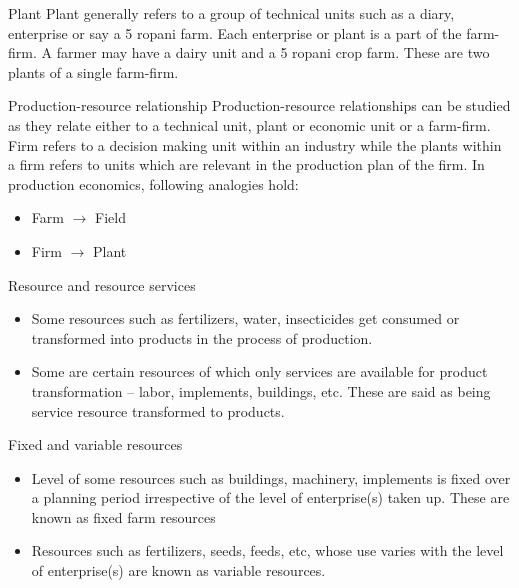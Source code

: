 \documentclass[12pt,ignorenonframetext,aspectratio=169]{beamer}
\providecommand{\tightlist}{%
  \setlength{\itemsep}{0pt}\setlength{\parskip}{0pt}}
\begin{document}
\begin{frame}{}
\protect\hypertarget{section-3}{}
\begin{block}{Plant}
\protect\hypertarget{plant}{}
Plant generally refers to a group of technical units such as a diary,
enterprise or say a 5 ropani farm. Each enterprise or plant is a part of
the farm-firm. A farmer may have a dairy unit and a 5 ropani crop farm.
These are two plants of a single farm-firm.
\end{block}

\begin{block}{Production-resource relationship}
\protect\hypertarget{production-resource-relationship}{}
Production-resource relationships can be studied as they relate either
to a technical unit, plant or economic unit or a farm-firm. Firm refers
to a decision making unit within an industry while the plants within a
firm refers to units which are relevant in the production plan of the
firm. In production economics, following analogies hold:

\begin{itemize}
  \item Farm $\longrightarrow$ Field
  \item Firm $\longrightarrow$ Plant
  \end{itemize}
\end{block}
\end{frame}

\begin{frame}{}
\protect\hypertarget{section-4}{}
\begin{block}{Resource and resource services}
\protect\hypertarget{resource-and-resource-services}{}
\begin{itemize}
\tightlist
\item
  Some resources such as fertilizers, water, insecticides get consumed
  or transformed into products in the process of production.
\item
  Some are certain resources of which only services are available for
  product transformation -- labor, implements, buildings, etc. These are
  said as being service resource transformed to products.
\end{itemize}
\end{block}

\begin{block}{Fixed and variable resources}
\protect\hypertarget{fixed-and-variable-resources}{}
\begin{itemize}
\tightlist
\item
  Level of some resources such as buildings, machinery, implements is
  fixed over a planning period irrespective of the level of
  enterprise(s) taken up. These are known as fixed farm resources
\item
  Resources such as fertilizers, seeds, feeds, etc, whose use varies
  with the level of enterprise(s) are known as variable resources.
\end{itemize}
\end{block}
\end{frame}
\end{document}
